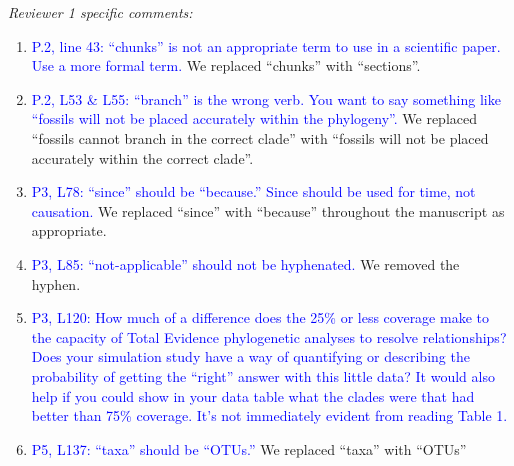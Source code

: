 \documentclass[12pt,letterpaper]{article}
\renewcommand{\subsection}[1]{%
\bigskip
\begin{center}
\begin{large}
\normalfont\itshape #1
\end{large}
\end{center}}
\begin{document}

\subsection{Reviewer 1 specific comments:}
\begin{enumerate}
\item{\textcolor{blue}{P.2, line 43: ``chunks'' is not an appropriate term to use in a scientific paper. Use a more formal term.}}
We replaced ``chunks'' with ``sections''.

\item{\textcolor{blue}{P.2, L53 \& L55: ``branch'' is the wrong verb. You want to say something like ``fossils will not be placed accurately within the phylogeny''.}}
We replaced ``fossils cannot branch in the correct clade'' with ``fossils will not be placed accurately within the correct clade''.

\item{\textcolor{blue}{P3, L78: ``since'' should be ``because.'' Since should be used for time, not causation.}}
We replaced ``since'' with ``because'' throughout the manuscript as appropriate.

\item{\textcolor{blue}{P3, L85: ``not-applicable'' should not be hyphenated.}}
We removed the hyphen.

\item{\textcolor{blue}{P3, L120: How much of a difference does the 25\% or less coverage make to the capacity of Total Evidence phylogenetic analyses to resolve relationships? Does your simulation study have a way of quantifying or describing the probability of getting the ``right'' answer with this little data? It would also help if you could show in your data table what the clades were that had better than 75\% coverage. It's not immediately evident from reading Table 1.}}


\item{\textcolor{blue}{P5, L137: ``taxa'' should be ``OTUs.''}}
We replaced ``taxa'' with ``OTUs''


\end{enumerate}
\end{document}
